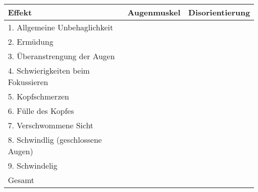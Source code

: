 \documentclass[a4paper,10pt,BCOR10mm,oneside,headsepline]{scrartcl}
\begin{document}
	\begin{center}
		\begin{tabular}{| l | c | c |}
			\hline
			Effekt & Augenmuskel & Disorientierung\\
			\hline
			1. Allgemeine Unbehaglichkeit & &\\
			\hline
			2. Erm\"udung & & \\
			\hline
			3. \"Uberanstrengung der Augen &  &\\
			\hline
			4. Schwierigkeiten beim Fokussieren & & \\
			\hline
			5. Kopfschmerzen & &  \\
			\hline
			6. F\"ulle des Kopfes & &  \\
			\hline
			7. Verschwommene Sicht & &  \\
			\hline
			8. Schwindlig (geschlossene Augen) & & \\
			\hline
			9. Schwindelig &  &\\
			\hline
			\hline
			Gesamt &  & \\
			\hline
		\end{tabular}
	\end{center}
\end{document}

